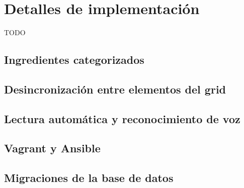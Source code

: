 \section{Detalles de implementación}

TODO

\subsection{Ingredientes categorizados}











\subsection{Desincronización entre elementos del grid}




\subsection{Lectura automática y reconocimiento de voz}

    

\subsection{Vagrant y Ansible}




\subsection{Migraciones de la base de datos}
